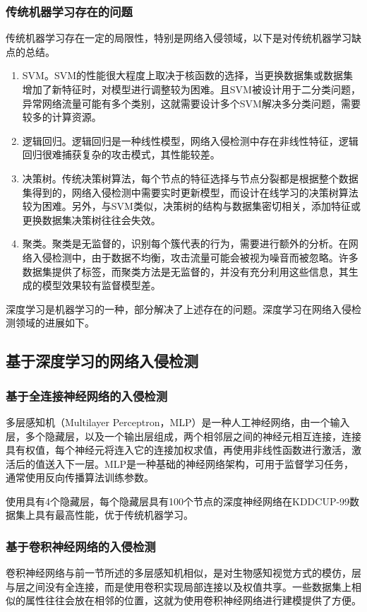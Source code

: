 \subsubsection{传统机器学习存在的问题}
传统机器学习存在一定的局限性，特别是网络入侵领域，以下是对传统机器学习缺点的总结。
\begin{enumerate}
    \item SVM。SVM的性能很大程度上取决于核函数的选择，当更换数据集或数据集增加了新特征时，对模型进行调整较为困难。且SVM被设计用于二分类问题，异常网络流量可能有多个类别，这就需要设计多个SVM解决多分类问题，需要较多的计算资源。
    \item 逻辑回归。逻辑回归是一种线性模型，网络入侵检测中存在非线性特征，逻辑回归很难捕获复杂的攻击模式，其性能较差。
    \item 决策树。传统决策树算法，每个节点的特征选择与节点分裂都是根据整个数据集得到的，网络入侵检测中需要实时更新模型，而设计在线学习的决策树算法较为困难。另外，与SVM类似，决策树的结构与数据集密切相关，添加特征或更换数据集决策树往往会失效。
    \item 聚类。聚类是无监督的，识别每个簇代表的行为，需要进行额外的分析。在网络入侵检测中，由于数据不均衡，攻击流量可能会被视为噪音而被忽略。许多数据集提供了标签，而聚类方法是无监督的，并没有充分利用这些信息，其生成的模型效果较有监督模型差。
\end{enumerate}

深度学习是机器学习的一种，部分解决了上述存在的问题。深度学习在网络入侵检测领域的进展如下。

\subsection{基于深度学习的网络入侵检测}
\subsubsection{基于全连接神经网络的入侵检测}
多层感知机（Multilayer Perceptron，MLP）是一种人工神经网络，由一个输入层，多个隐藏层，以及一个输出层组成，两个相邻层之间的神经元相互连接，连接具有权值，每个神经元将连入它的连接加权求值，再使用非线性函数进行激活，激活后的值送入下一层。MLP是一种基础的神经网络架构，可用于监督学习任务，通常使用反向传播算法训练参数。

使用具有4个隐藏层，每个隐藏层具有100个节点的深度神经网络在KDDCUP-99数据集上具有最高性能，优于传统机器学习\cite{10.1049/iet-ifs.2018.5258}。


\subsubsection{基于卷积神经网络的入侵检测}
卷积神经网络与前一节所述的多层感知机相似，是对生物感知视觉方式的模仿，层与层之间没有全连接，而是使用卷积实现局部连接以及权值共享。一些数据集上相似的属性往往会放在相邻的位置，这就为使用卷积神经网络进行建模提供了方便。

